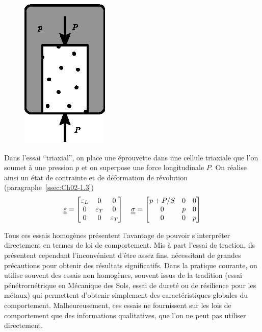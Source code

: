 \begin{figure}
    \begin{center}
        \includegraphics{../images/T1_Ch04-0010}
    \end{center}
\end{figure}
Dans l'essai ``triaxial'', on place une éprouvette dans une cellule triaxiale que l'on soumet à une pression $p$ et on superpose une force longitudinale $P$.
On réalise ainsi un état de contrainte et de déformation de révolution (paragraphe~\ref{ssec:Ch02-1.3})
\begin{equation}
    \underline{\underline{\varepsilon}} =
    \begin{bmatrix}
        \varepsilon_L & 0 & 0 \\
        0 & \varepsilon_T & 0 \\
        0 & 0 & \varepsilon _T
    \end{bmatrix}
    \quad
    \underline{\underline{\sigma}} = 
    \begin{bmatrix}
        p + P/S & 0 & 0 \\
        0 & p & 0 \\
        0 & 0 & p
    \end{bmatrix}
    \label{eq:Ch04-038}
\end{equation}

Tous ces essais homogènes présentent l'avantage de pouvoir s'interpréter directement en termes de loi de comportement.
Mis à part l'essai de traction, ils présentent cependant l'inconvénient d'être assez fins, nécessitant de grandes précautions pour obtenir des résultats significatifs.
Dans la pratique courante, on utilise souvent des essais non homogènes, souvent issus de la tradition (essai pénétrornétrique en Mécanique des Sols, essai de dureté ou de résilience pour les métaux) qui permettent d'obtenir simplement des caractéristiques globales du comportement.
Malheureusement, ces essais ne fournissent sur les lois de comportement que des informations qualitatives, que l'on ne peut pas utiliser directement.

